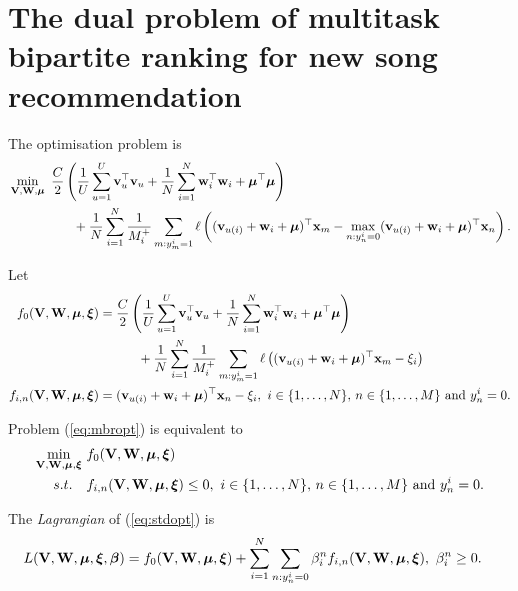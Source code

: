 \section{The dual problem of multitask bipartite ranking for new song recommendation}

The optimisation problem is
\begin{equation}
\label{eq:mbropt}
\begin{aligned}
&\min_{\mathbf{V}, \mathbf{W}, \bm{\mu}} \ \frac{C}{2} \left( \frac{1}{U} \sum_{u=1}^U \mathbf{v}_u^\top \mathbf{v}_u 
     + \frac{1}{N} \sum_{i=1}^N \mathbf{w}_i^\top \mathbf{w}_i + \bm{\mu}^\top \bm{\mu} \right) \\
& \hspace{5em}
     + \frac{1}{N} \sum_{i=1}^N \frac{1}{M_i^+} \sum_{m: y_m^i = 1} \ell \left( (\mathbf{v}_{u(i)} + \mathbf{w}_i + \bm{\mu})^\top \mathbf{x}_m 
     - \max_{n: y_n^i = 0} (\mathbf{v}_{u(i)} + \mathbf{w}_i + \bm{\mu})^\top \mathbf{x}_n \right).
\end{aligned}
\end{equation}

Let 
\begin{equation*}
\begin{aligned}
f_0(\mathbf{V}, \mathbf{W}, \bm{\mu}, \bm{\xi}) &= \frac{C}{2} \left( \frac{1}{U} \sum_{u=1}^U \mathbf{v}_u^\top \mathbf{v}_u 
     + \frac{1}{N} \sum_{i=1}^N \mathbf{w}_i^\top \mathbf{w}_i + \bm{\mu}^\top \bm{\mu} \right) \\
& \hspace{3em}
     + \frac{1}{N} \sum_{i=1}^N \frac{1}{M_i^+} \sum_{m: y_m^i = 1} 
       \ell \left( (\mathbf{v}_{u(i)} + \mathbf{w}_i + \bm{\mu})^\top \mathbf{x}_m - \xi_i \right) \\
f_{i,n} (\mathbf{V}, \mathbf{W}, \bm{\mu}, \bm{\xi}) &= (\mathbf{v}_{u(i)} + \mathbf{w}_i + \bm{\mu})^\top \mathbf{x}_n - \xi_i, \
i \in \{1,\dots,N\}, \, n \in \{1,\dots,M\} \ \mathrm{and} \ y_n^i = 0.
\end{aligned}
\end{equation*}

Problem (\ref{eq:mbropt}) is equivalent to 
\begin{equation}
\label{eq:stdopt}
\begin{aligned}
\min_{\mathbf{V}, \mathbf{W}, \bm{\mu}, \bm{\xi}} \ & f_0(\mathbf{V}, \mathbf{W}, \bm{\mu}, \bm{\xi}) \\
s.t. \quad & f_{i,n}(\mathbf{V}, \mathbf{W}, \bm{\mu}, \bm{\xi}) \le 0, \
i \in \{1,\dots,N\}, \, n \in \{1,\dots,M\} \ \mathrm{and} \ y_n^i = 0.
\end{aligned}
\end{equation}

The \emph{Lagrangian} of (\ref{eq:stdopt}) is
\begin{equation*}
\begin{aligned}
L(\mathbf{V}, \mathbf{W}, \bm{\mu}, \bm{\xi}, {\bm{\beta}}) 
&= f_0(\mathbf{V}, \mathbf{W}, \bm{\mu}, \bm{\xi}) + \sum_{i=1}^N \sum_{n: y_n^i = 0} \beta_i^n f_{i,n} (\mathbf{V}, \mathbf{W}, \bm{\mu}, \bm{\xi}), \
\beta_i^n \ge 0.
\end{aligned}
\end{equation*}

